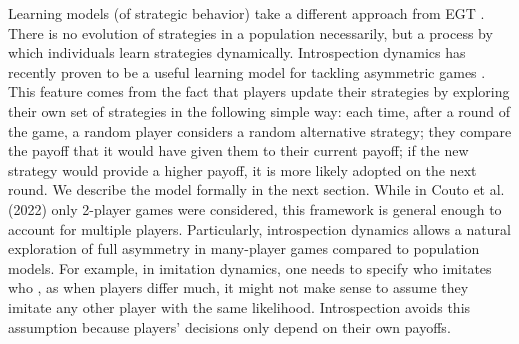 \documentclass[11pt]{article}
\theoremstyle{plainCl1}
\theoremstyle{plainCl2}
\begin{document}
\noindent Learning models (of strategic behavior) take a different approach from EGT \cite{Sandholm:BioSys:1996, Fudenberg:book:1998b, Macy:PNAS:2002, Hofbauer:GEB:2005, Tuyls:bookchapter:2005, Galla:PNAS:2013, Barfuss:PRE:2019, Barfuss:PNAS:2020, Pangallo:GEB:2022}. There is no evolution of strategies in a population necessarily, but a process by which individuals learn strategies dynamically. 
\noindent Introspection dynamics has recently proven to be a useful learning model for tackling asymmetric games \cite{Couto:NJP:2022, Hauser:Nature:2019, McAvoy:PNASnexus:2022, Schmid:PlosCB:2022}. 
This feature comes from the fact that players update their strategies by exploring their own set of strategies in the following simple way: each time, after a round of the game, a random player considers a random alternative strategy; they compare the payoff that it would have given them to their current payoff; if the new strategy would provide a higher payoff, it is more likely adopted on the next round. We describe the model formally in the next section. 
While in Couto et al. (2022) \cite{Couto:NJP:2022} only 2-player games were considered, this framework is general enough to account for multiple players.  Particularly, introspection dynamics allows a natural exploration of full asymmetry in many-player games compared to population models. For example, in imitation dynamics, one needs to specify who imitates who \cite{Vasconcelos:PNAS:2014}, as when players differ much, it might not make sense to assume they imitate any other player with the same likelihood. Introspection avoids this assumption because players' decisions only depend on their own payoffs.
\end{document}
